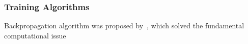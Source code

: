 \subsubsection{Training Algorithms}
Backpropagation algorithm was proposed by~\citet{werbos1975beyond}, which solved the fundamental computational issue